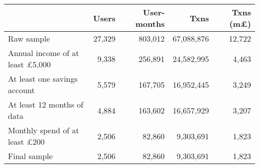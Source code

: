 \begin{tabular}{lrrrr}
\toprule
                                       &  Users & User-months &       Txns & Txns (m\pounds) \\
\midrule
                            Raw sample & 27,329 &     803,012 & 67,088,876 &          12,722 \\
Annual income of at least \pounds5,000 &  9,338 &     256,891 & 24,582,995 &           4,463 \\
          At least one savings account &  5,579 &     167,705 & 16,952,445 &           3,249 \\
            At least 12 months of data &  4,884 &     163,602 & 16,657,929 &           3,207 \\
  Monthly spend of at least \pounds200 &  2,506 &      82,860 &  9,303,691 &           1,823 \\
                          Final sample &  2,506 &      82,860 &  9,303,691 &           1,823 \\
\bottomrule
\end{tabular}
